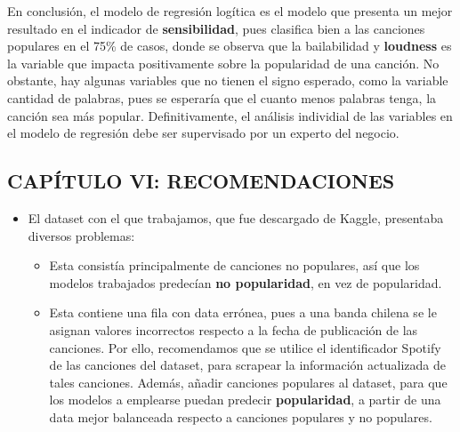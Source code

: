 \documentclass[
  letterpaper,
  DIV=11,
  numbers=noendperiod]{scrartcl}
\providecommand{\tightlist}{%
  \setlength{\itemsep}{0pt}\setlength{\parskip}{0pt}}
\begin{document}
En conclusión, el modelo de regresión logítica es el modelo que presenta
un mejor resultado en el indicador de \textbf{sensibilidad}, pues
clasifica bien a las canciones populares en el 75\% de casos, donde se
observa que la bailabilidad y \textbf{loudness} es la variable que
impacta positivamente sobre la popularidad de una canción. No obstante,
hay algunas variables que no tienen el signo esperado, como la variable
cantidad de palabras, pues se esperaría que el cuanto menos palabras
tenga, la canción sea más popular. Definitivamente, el análisis
individial de las variables en el modelo de regresión debe ser
supervisado por un experto del negocio.

\hypertarget{capuxedtulo-vi-recomendaciones}{%
\subsection{CAPÍTULO VI:
RECOMENDACIONES}\label{capuxedtulo-vi-recomendaciones}}

\begin{itemize}
\tightlist
\item
  El dataset con el que trabajamos, que fue descargado de Kaggle,
  presentaba diversos problemas:

  \begin{itemize}
  \tightlist
  \item
    Esta consistía principalmente de canciones no populares, así que los
    modelos trabajados predecían \textbf{no popularidad}, en vez de
    popularidad.
  \item
    Esta contiene una fila con data errónea, pues a una banda chilena se
    le asignan valores incorrectos respecto a la fecha de publicación de
    las canciones. Por ello, recomendamos que se utilice el
    identificador Spotify de las canciones del dataset, para scrapear la
    información actualizada de tales canciones. Además, añadir canciones
    populares al dataset, para que los modelos a emplearse puedan
    predecir \textbf{popularidad}, a partir de una data mejor balanceada
    respecto a canciones populares y no populares.
  \end{itemize}
\end{itemize}
\end{document}
